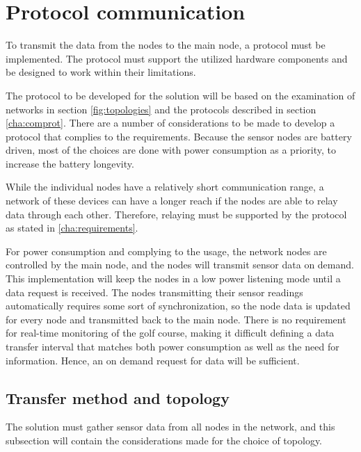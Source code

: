 \section{Protocol communication}\label{cha:protocolDesign}
To transmit the data from the nodes to the main node, a protocol must be implemented.
The protocol must support the utilized hardware components and be designed to work within their limitations. 

The protocol to be developed for the solution will be based on the examination of networks in section \ref{fig:topologies} and the protocols described in section \ref{cha:comprot}.
There are a number of considerations to be made to develop a protocol that complies to the requirements.
Because the sensor nodes are battery driven, most of the choices are done with power consumption as a priority, to increase the battery longevity.

While the individual nodes have a relatively short communication range, a network of these devices can have a longer reach if the nodes are able to relay data through each other.
Therefore, relaying must be supported by the protocol as stated in \ref{cha:requirements}. 

For power consumption and complying to the usage, the network nodes are controlled by the main node, and the nodes will transmit sensor data on demand.
This implementation will keep the nodes in a low power listening mode until a data request is received.
The nodes transmitting their sensor readings automatically requires some sort of synchronization, so the node data is updated for every node and transmitted back to the main node.
There is no requirement for real-time monitoring of the golf course, making it difficult defining a data transfer interval that matches both power consumption as well as the need for information.
Hence, an on demand request for data will be sufficient.

\subsection{Transfer method and topology}
The solution must gather sensor data from all nodes in the network, and this subsection will contain the considerations made for the choice of topology.

